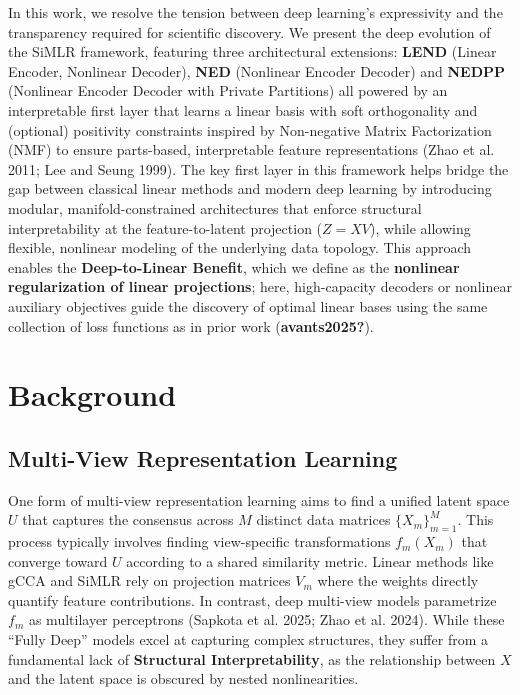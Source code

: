 \documentclass[
  letterpaper,
]{report}
\begin{document}
In this work, we resolve the tension between deep learning's
expressivity and the transparency required for scientific discovery. We
present the deep evolution of the SiMLR framework, featuring three
architectural extensions: \textbf{LEND} (Linear Encoder, Nonlinear
Decoder), \textbf{NED} (Nonlinear Encoder Decoder) and \textbf{NEDPP}
(Nonlinear Encoder Decoder with Private Partitions) all powered by an
interpretable first layer that learns a linear basis with soft
orthogonality and (optional) positivity constraints inspired by
Non-negative Matrix Factorization (NMF) to ensure parts-based,
interpretable feature representations (Zhao et al. 2011; Lee and Seung
1999). The key first layer in this framework helps bridge the gap
between classical linear methods and modern deep learning by introducing
modular, manifold-constrained architectures that enforce structural
interpretability at the feature-to-latent projection (\(Z = XV\)), while
allowing flexible, nonlinear modeling of the underlying data topology.
This approach enables the \textbf{Deep-to-Linear Benefit}, which we
define as the \textbf{nonlinear regularization of linear projections};
here, high-capacity decoders or nonlinear auxiliary objectives guide the
discovery of optimal linear bases using the same collection of loss
functions as in prior work (\textbf{avants2025?}).

\section{Background}\label{background}

\subsection{Multi-View Representation
Learning}\label{multi-view-representation-learning}

One form of multi-view representation learning aims to find a unified
latent space \(U\) that captures the consensus across \(M\) distinct
data matrices \(\{X_m\}_{m=1}^M\). This process typically involves
finding view-specific transformations \(f_m(X_m)\) that converge toward
\(U\) according to a shared similarity metric. Linear methods like gCCA
and SiMLR rely on projection matrices \(V_m\) where the weights directly
quantify feature contributions. In contrast, deep multi-view models
parametrize \(f_m\) as multilayer perceptrons (Sapkota et al. 2025; Zhao
et al. 2024). While these ``Fully Deep'' models excel at capturing
complex structures, they suffer from a fundamental lack of
\textbf{Structural Interpretability}, as the relationship between \(X\)
and the latent space is obscured by nested nonlinearities.
\end{document}
